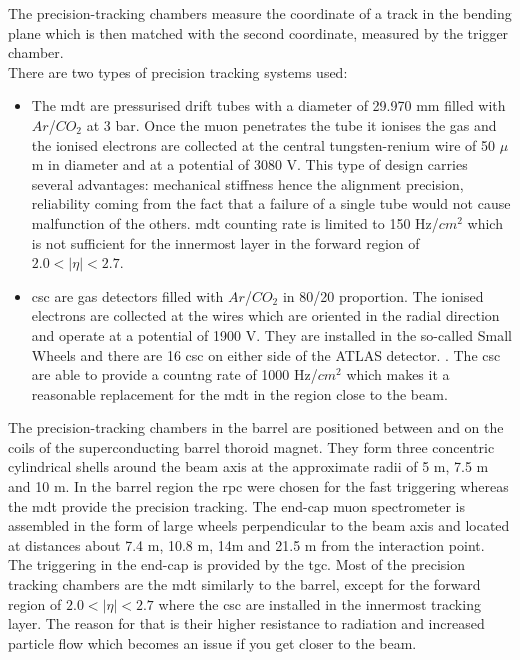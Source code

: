 	The precision-tracking chambers measure the coordinate of a track in the bending plane which is then matched with the second coordinate, measured by the trigger chamber. \\
	There are two types of precision tracking systems used:
	\begin{itemize}
	\item The \gls{mdt} are pressurised drift tubes with a diameter of 29.970 mm filled with $Ar$/$CO_2$ at 3 bar. Once the muon penetrates the tube it ionises the gas and the ionised electrons are collected at the central tungsten-renium wire of 50 $\mu$m in diameter and at a potential of 3080 V. This type of design carries several advantages: mechanical stiffness hence the alignment precision, reliability coming from the fact that a failure of a single tube would not cause malfunction of the others. \gls{mdt} counting rate is limited to 150 Hz/$cm^2$ which is not sufficient for the innermost layer in the forward region of $2.0 < |\eta| < 2.7$.
	\item \gls{csc} are gas detectors filled with $Ar$/$CO_2$ in 80/20 proportion. The ionised electrons are collected at the wires which are oriented in the radial direction and operate at a potential of 1900 V. They are installed in the so-called Small Wheels and there are 16  \gls{csc} on either side of the ATLAS detector. . The \gls{csc} are able to provide a countng rate of 1000 Hz/$cm^2$ which makes it a reasonable replacement for the \gls{mdt} in the region close to the beam.
	\end{itemize} 
	 The precision-tracking chambers in the barrel are positioned between and on the coils of the superconducting barrel thoroid magnet. They form three concentric cylindrical shells around the beam axis at the approximate radii of 5 m, 7.5 m and 10 m. In the barrel region the \gls{rpc} were chosen for the fast triggering whereas the \gls{mdt} provide the precision tracking. 
	 The end-cap muon spectrometer is assembled in the form of large wheels perpendicular to the beam axis and located at distances about 7.4 m, 10.8 m, 14m and 21.5 m from the interaction point. The triggering in the end-cap is provided by the \gls{tgc}. Most of the precision tracking chambers are the \gls{mdt}  similarly to the barrel, except for the forward region of $2.0 < |\eta| < 2.7$ where the \gls{csc} are installed in the innermost tracking layer. The reason for that is their higher resistance to radiation and increased particle flow which becomes an issue if you get closer to the beam. \\
